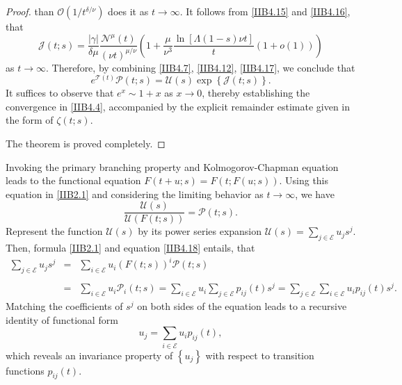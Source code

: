 \documentclass[10pt,reqno]{amsart}
\theoremstyle{definition}
\numberwithin{equation}{section}
\begin{document}
\begin{proof}
    than $\mathcal{O}\left({1}/{t^{\delta/\nu}}\right)$ does it as $t\to\infty$. It follows from {\eqref{IIB4.15}}
    and {\eqref{IIB4.16}}, that
\begin{equation}                \label{IIB4.17}
    \mathcal{J}(t;s)=\frac{|\gamma|}{\delta\mu}\frac{{{\mathcal{N}}^{\mu}}(t)}{{(\nu{t})}^{{\mu}/{\nu}}}
    \left(1+\frac{\mu}{{\nu}^{3}}\frac{\ln\left[\Lambda(1-s)\nu{t}\right]}{t}\left(1+o(1)\right)\right)
\end{equation}
    as $t\to\infty$. Therefore, by combining {\eqref{IIB4.7}}, {\eqref{IIB4.12}}, {\eqref{IIB4.17}},
    we conclude that
\[
    {e^{\mathcal{T}(t)}}\mathcal{P}(t;s)=\mathcal{U}(s)\exp\left\{\mathcal{J}(t;s)\right\}.
\]
    It suffices to observe that ${e^x}\sim{1+x}$ as $x\to{0}$, thereby establishing the convergence
    in {\eqref{IIB4.4}}, accompanied by the explicit remainder estimate given in the form of $\zeta(t;s)$.

    The theorem is proved completely.
\end{proof}

    Invoking the primary branching property and Kolmogorov-Chapman equation leads to the functional
    equation $F(t+u;s)=F\left(t;F(u;s)\right)$. Using this equation in {\eqref{IIB2.1}} and considering
    the limiting behavior as $t\to\infty$, we have
\begin{equation}                \label{IIB4.18}
    \frac{\mathcal{U}(s)}{\mathcal{U}\left(F(t;s)\right)}=\mathcal{P}(t;s).
\end{equation}
    Represent the function $\mathcal{U}(s)$ by its power series expansion
    $\mathcal{U}(s)=\sum_{j\in\mathcal{E}}{{u_j}{s^j}}$. Then, formula {\eqref{IIB2.1}}
    and equation {\eqref{IIB4.18}} entails, that
\begin{eqnarray*}
    {\sum_{j\in\mathcal{E}}{{u_j}{s^j}}}
& = & \sum_{i\in \mathcal{E}}{{{u}_{i}}{{\left(F(t;s)\right)}^{i}}\mathcal{P}(t;s)} \nonumber\\
\ \nonumber\\
& = & \sum_{i\in\mathcal{E}}{{{u}_{i}}{{\mathcal{P}}_{i}}(t;s)}=
        \sum_{i\in\mathcal{E}}{{{u}_{i}}\sum_{j\in \mathcal{E}}{{{p}_{ij}}(t){{s}^{j}}}}=
        \sum_{j\in\mathcal{E}}{\sum_{i\in\mathcal{E}}{{{u}_{i}}{p_{ij}}(t){s^{j}}}}.
\end{eqnarray*}
    Matching the coefficients of ${{s}^{j}}$ on both sides of the equation leads to a recursive identity of functional form
\[
    {{u}_{j}}=\sum_{i\in \mathcal{E}}{{{u}_{i}}{{p}_{ij}}(t)},
\]
    which reveals an invariance property of $\left\{{u_j}\right\}$ with respect to transition functions ${p_{ij}}(t)$.
\end{document}
